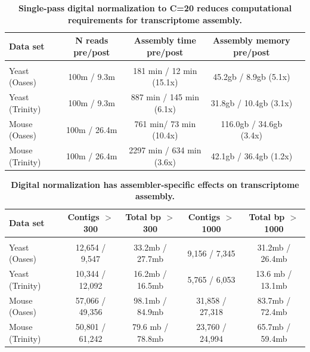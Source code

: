 \documentclass{pnastwo}
\begin{document}

\begin{table}[!ht]
\caption{
\bf{Single-pass digital normalization to C=20 reduces computational
requirements for transcriptome assembly.}}


\begin{tabular}{|l|c|c|c|c|}

Data set & N reads pre/post & Assembly time pre/post & Assembly memory pre/post \\
 \hline \\
Yeast (Oases) & 100m / 9.3m & 181 min / 12 min (15.1x) & 45.2gb / 8.9gb (5.1x) \\
Yeast (Trinity) & 100m / 9.3m & 887 min / 145 min (6.1x) & 31.8gb / 10.4gb (3.1x) \\
Mouse (Oases) & 100m / 26.4m & 761 min/ 73 min (10.4x) & 116.0gb / 34.6gb (3.4x) \\
Mouse (Trinity) & 100m / 26.4m & 2297 min / 634 min (3.6x) & 42.1gb / 36.4gb (1.2x) \\
\end{tabular}

\begin{flushleft}
\end{flushleft}
\label{tab:dntrans}
\end{table}


\begin{table}[!ht]
\caption{
\bf{Digital normalization has assembler-specific effects on transcriptome
assembly.}}


\begin{tabular}{|l|c|c|c|c|}

Data set & Contigs $>$ 300 & Total bp $>$ 300 & Contigs $>$ 1000 & Total bp $>$ 1000 \\
\hline \\
Yeast (Oases) & 12,654 / 9,547 & 33.2mb / 27.7mb & 9,156 / 7,345 & 31.2mb / 26.4mb \\
Yeast (Trinity) & 10,344 / 12,092 & 16.2mb / 16.5mb & 5,765 / 6,053 & 13.6 mb / 13.1mb \\
Mouse (Oases) & 57,066 / 49,356 & 98.1mb / 84.9mb & 31,858 / 27,318 & 83.7mb / 72.4mb \\
Mouse (Trinity) & 50,801 / 61,242 & 79.6 mb / 78.8mb & 23,760 / 24,994 & 65.7mb / 59.4mb \\

\end{tabular}

\begin{flushleft}
\end{flushleft}
\label{tab:dntrans0}
\end{table}
\end{document}
